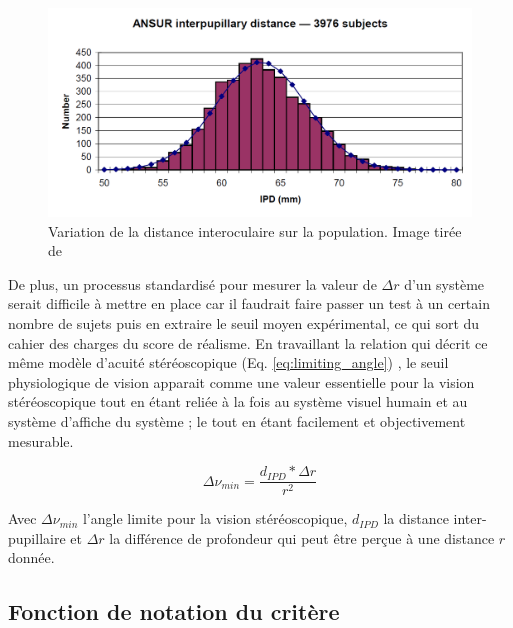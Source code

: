 	\begin{figure}
		\centering
		\includegraphics[scale=.5]{Figures/ANSURIPD}
		\caption{Variation de la distance interoculaire sur la population. Image tirée de \citep{dodgson_variation_2004}}
		\label{fig:variation_dio_population}
	\end{figure}
	
	\par De plus, un processus standardisé pour mesurer la valeur de $\Delta r$ d'un système serait difficile à mettre en place car il faudrait faire passer un test à un certain nombre de sujets puis en extraire le seuil moyen expérimental, ce qui sort du cahier des charges du score de réalisme. En travaillant la relation qui décrit ce même modèle d'acuité stéréoscopique (Eq. \ref{eq:limiting_angle}) \citep{gross_human_2008}, le seuil physiologique de vision apparait comme une valeur essentielle pour la vision stéréoscopique tout en étant reliée à la fois au système visuel humain et au système d'affiche du système ; le tout en étant facilement et objectivement mesurable. 
	
	\begin{equation}	
		\Delta \nu_{min} = \frac{d_{IPD} * \Delta r}{r^2}
		\label{eq:limiting_angle}
	\end{equation}
	
	\par Avec $\Delta \nu_{min}$ l'angle limite pour la vision stéréoscopique, $d_{IPD}$ la distance inter-pupillaire et $\Delta r$ la différence de profondeur qui peut être perçue à une distance $r$ donnée.
	
	\subsection{Fonction de notation du critère}

